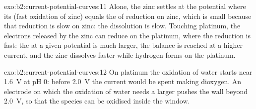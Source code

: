 \begin{solution}{exo:b2:current-potential-curves:11}
Alone, the zinc settles at the potential where its  (fast
oxidation of zinc) equals the  of  reduction on zinc,
which is small because that reduction is slow on zinc: the dissolution is
slow. Touching platinum, the electrons released by the zinc can reduce 
on the platinum, where the reduction is fast: the  at a given
potential is much larger, the balance is reached at a higher current, and the
zinc dissolves faster while hydrogen forms on the platinum.
\end{solution}

\begin{solution}{exo:b2:current-potential-curves:12}
On platinum the oxidation of water starts near \qty{1.6}{V} at pH 0: before
\qty{2.0}{V} the current would be spent making dioxygen. An electrode on which
the oxidation of water needs a larger  pushes the wall beyond
\qty{2.0}{V}, so that the species can be oxidised inside the window.
\end{solution}

